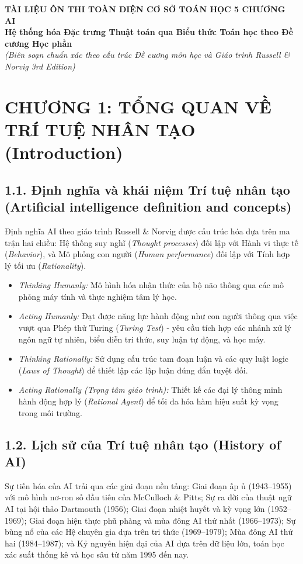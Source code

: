 \documentclass[../main.tex]{subfiles}
\begin{document}

\begin{center}
    \textbf{\LARGE TÀI LIỆU ÔN THI TOÀN DIỆN CƠ SỞ TOÁN HỌC 5 CHƯƠNG AI} \\
    \vspace{0.2cm}
    \textbf{\large Hệ thống hóa Đặc trưng Thuật toán qua Biểu thức Toán học theo Đề cương Học phần} \\
    \textit{(Biên soạn chuẩn xác theo cấu trúc Đề cương môn học và Giáo trình Russell \& Norvig 3rd Edition)}
\end{center}

\vspace{0.5cm}

\section{CHƯƠNG 1: TỔNG QUAN VỀ TRÍ TUỆ NHÂN TẠO (Introduction)}
\subsection{1.1. Định nghĩa và khái niệm Trí tuệ nhân tạo (Artificial intelligence definition and concepts)}
Định nghĩa AI theo giáo trình Russell \& Norvig được cấu trúc hóa dựa trên ma trận hai chiều: Hệ thống suy nghĩ (\textit{Thought processes}) đối lập với Hành vi thực tế (\textit{Behavior}), và Mô phỏng con người (\textit{Human performance}) đối lập với Tính hợp lý tối ưu (\textit{Rationality}).
\begin{itemize}
    \item \textit{Thinking Humanly:} Mô hình hóa nhận thức của bộ não thông qua các mô phỏng máy tính và thực nghiệm tâm lý học.
    \item \textit{Acting Humanly:} Đạt được năng lực hành động như con người thông qua việc vượt qua Phép thử Turing (\textit{Turing Test}) - yêu cầu tích hợp các nhánh xử lý ngôn ngữ tự nhiên, biểu diễn tri thức, suy luận tự động, và học máy.
    \item \textit{Thinking Rationally:} Sử dụng cấu trúc tam đoạn luận và các quy luật logic (\textit{Laws of Thought}) để thiết lập các lập luận đúng đắn tuyệt đối.
    \item \textit{Acting Rationally (Trọng tâm giáo trình):} Thiết kế các đại lý thông minh hành động hợp lý (\textit{Rational Agent}) để tối đa hóa hàm hiệu suất kỳ vọng trong môi trường.
\end{itemize}

\subsection{1.2. Lịch sử của Trí tuệ nhân tạo (History of AI)}
Sự tiến hóa của AI trải qua các giai đoạn nền tảng: Giai đoạn ấp ủ (1943--1955) với mô hình nơ-ron số đầu tiên của McCulloch \& Pitts; Sự ra đời của thuật ngữ AI tại hội thảo Dartmouth (1956); Giai đoạn nhiệt huyết và kỳ vọng lớn (1952--1969); Giai đoạn hiện thực phũ phàng và mùa đông AI thứ nhất (1966--1973); Sự bùng nổ của các Hệ chuyên gia dựa trên tri thức (1969--1979); Mùa đông AI thứ hai (1984--1987); và Kỷ nguyên hiện đại của AI dựa trên dữ liệu lớn, toán học xác suất thống kê và học sâu từ năm 1995 đến nay.
\end{document}
